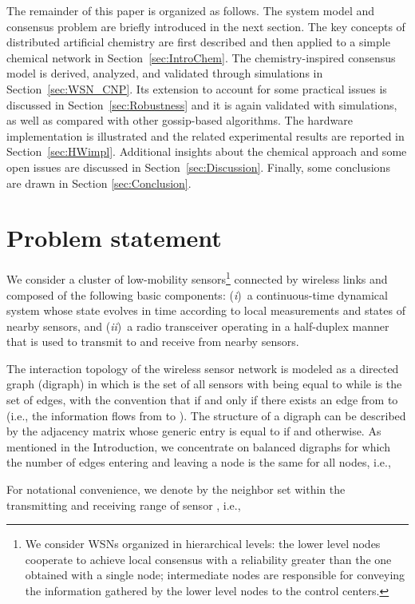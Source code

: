 \documentclass[journal]{IEEEtran}
\begin{document}
{The remainder of this paper is organized as follows. The system model and consensus problem are briefly introduced in the next section. The key concepts of distributed artificial chemistry are first described and then applied to a simple chemical network in Section~\ref{sec:IntroChem}. The chemistry-inspired consensus model is derived, analyzed, and validated through simulations in Section~\ref{sec:WSN_CNP}. Its extension to account for some practical issues is discussed in Section~\ref{sec:Robustness} and it is again validated with simulations, as well as compared with other gossip-based algorithms. The hardware implementation is illustrated and the related experimental results are reported in Section~\ref{sec:HWimpl}. Additional insights about the chemical approach and some open issues are discussed in Section~\ref{sec:Discussion}.
Finally, some conclusions are drawn in Section \ref{sec:Conclusion}.}

\section{Problem statement}\label{sec:probStatement}
{We consider a cluster of  low-mobility sensors\footnote{{We consider WSNs organized in hierarchical levels: the lower level nodes cooperate to achieve local consensus with a reliability greater than the one obtained with a single node; intermediate nodes are responsible for conveying the information gathered by the lower level nodes to the control centers.}} connected by wireless links and composed of the following basic components:}
(\emph{i})~a continuous-time dynamical system whose state evolves
in time according to local measurements and states of
nearby sensors, and (\emph{ii})~a radio transceiver {operating in a half-duplex manner} that is used to transmit
to and receive from nearby sensors. 

The interaction topology of the wireless sensor network is modeled as a {directed graph (digraph)}  in which  is the set of all sensors with  being equal to  while  is the set of edges, with the convention that  if and only if there exists an edge from { to } (i.e., the information flows from { to }). The structure of a digraph can be described by the  adjacency matrix  whose generic entry  is equal to  if  and  otherwise.  
As mentioned in the Introduction, we concentrate on balanced digraphs for which the number of edges entering and leaving a node is the same for all nodes, i.e.,

For notational convenience, we denote by  the neighbor set within the transmitting and receiving range of sensor , i.e.,
\end{document}
